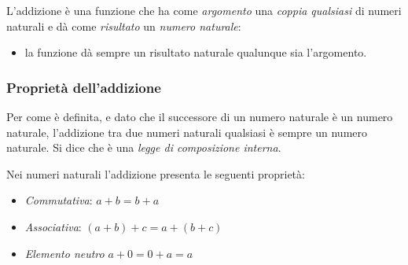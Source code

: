 L'addizione è una funzione che ha come \emph{argomento} una \emph{coppia 
qualsiasi} di numeri naturali e dà come \emph{risultato} un \emph{numero 
naturale}:

\vspace{2em}
\begin{minipage}[t]{.48\textwidth}
\begin{center}
\begin{inaccessibleblock}
\end{inaccessibleblock}
\end{center}
\end{minipage}
\hfill
\begin{minipage}[t]{.48\textwidth}
\begin{center}
\begin{inaccessibleblock}
\end{inaccessibleblock}
\end{center}
\end{minipage}

\vspace{-1em}
\begin{osservazione}
\begin{itemize} [nosep]
\item la funzione dà sempre un risultato naturale qualunque sia l'argomento.
\end{itemize}

\end{osservazione}

\subsubsection{Proprietà dell'addizione}

Per come è definita, e dato che il successore di un numero naturale è un 
numero naturale, l'addizione tra due numeri naturali qualsiasi è sempre un
numero naturale. 
Si dice che è una \emph{legge di composizione interna}. 

Nei numeri naturali l'addizione presenta le seguenti proprietà:

\begin{itemize} [noitemsep]
 \item \emph{Commutativa}: \(a + b = b + a\)
 \item \emph{Associativa}: \((a + b) + c = a + (b + c)\)
 \item \emph{Elemento neutro} \(a + 0 = 0 + a = a\)
\end{itemize}

